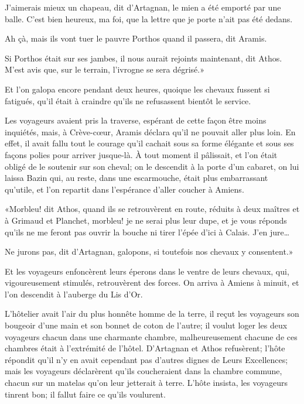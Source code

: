 \speak  J'aimerais mieux un chapeau, dit d'Artagnan, le mien a été emporté par une balle. C'est bien heureux, ma foi, que la lettre que je porte n'ait pas été dedans. 

\speak  Ah çà, mais ils vont tuer le pauvre Porthos quand il passera, dit Aramis. 

\speak  Si Porthos était sur ses jambes, il nous aurait rejoints maintenant, dit Athos. M'est avis que, sur le terrain, l'ivrogne se sera dégrisé.» 

Et l'on galopa encore pendant deux heures, quoique les chevaux fussent si fatigués, qu'il était à craindre qu'ils ne refusassent bientôt le service. 

Les voyageurs avaient pris la traverse, espérant de cette façon être moins inquiétés, mais, à Crève-cœur, Aramis déclara qu'il ne pouvait aller plus loin. En effet, il avait fallu tout le courage qu'il cachait sous sa forme élégante et sous ses façons polies pour arriver jusque-là. À tout moment il pâlissait, et l'on était obligé de le soutenir sur son cheval; on le descendit à la porte d'un cabaret, on lui laissa Bazin qui, au reste, dans une escarmouche, était plus embarrassant qu'utile, et l'on repartit dans l'espérance d'aller coucher à Amiens. 

«Morbleu! dit Athos, quand ils se retrouvèrent en route, réduits à deux maîtres et à Grimaud et Planchet, morbleu! je ne serai plus leur dupe, et je vous réponds qu'ils ne me feront pas ouvrir la bouche ni tirer l'épée d'ici à Calais. J'en jure\dots 

\speak  Ne jurons pas, dit d'Artagnan, galopons, si toutefois nos chevaux y consentent.» 

Et les voyageurs enfoncèrent leurs éperons dans le ventre de leurs chevaux, qui, vigoureusement stimulés, retrouvèrent des forces. On arriva à Amiens à minuit, et l'on descendit à l'auberge du Lis d'Or. 

L'hôtelier avait l'air du plus honnête homme de la terre, il reçut les voyageurs son bougeoir d'une main et son bonnet de coton de l'autre; il voulut loger les deux voyageurs chacun dans une charmante chambre, malheureusement chacune de ces chambres était à l'extrémité de l'hôtel. D'Artagnan et Athos refusèrent; l'hôte répondit qu'il n'y en avait cependant pas d'autres dignes de Leurs Excellences; mais les voyageurs déclarèrent qu'ils coucheraient dans la chambre commune, chacun sur un matelas qu'on leur jetterait à terre. L'hôte insista, les voyageurs tinrent bon; il fallut faire ce qu'ils voulurent. 

